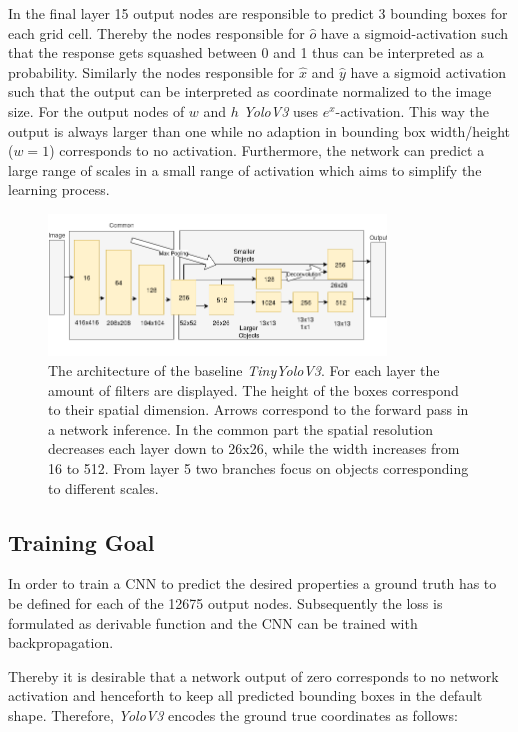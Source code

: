 	In the final layer 15 output nodes are responsible to predict 3 bounding boxes for each grid cell. Thereby the nodes responsible for $\hat o$ have a sigmoid-activation such that the response gets squashed between 0 and 1 thus can be interpreted as a probability. Similarly the nodes responsible for $\hat x$ and $\hat y$ have a sigmoid activation such that the output can be interpreted as coordinate normalized to the image size. For the output nodes of $w$ and $h$ \textit{YoloV3} uses $e^x$-activation. This way the output is always larger than one while no adaption in bounding box width/height ($w=1$) corresponds to no activation. Furthermore, the network can predict a large range of scales in a small range of activation which aims to simplify the learning process.
	
			
	\begin{figure}[hbtp]
		\centering
		\includegraphics[width=0.8\textwidth]{fig/tinyyolov3_arch}
		\caption{The architecture of the baseline \textit{TinyYoloV3}. For each layer the amount of filters are displayed. The height of the boxes correspond to their spatial dimension. Arrows correspond to the forward pass in a network inference. In the common part the spatial resolution decreases each layer down to 26x26, while the width increases from 16 to 512. From layer 5 two branches focus on objects corresponding to different scales. }
		\label{fig:tinyyolov3_arch}
	\end{figure}
	

	\subsection{Training Goal}
	
	In order to train a \ac{CNN} to predict the desired properties a ground truth has to be defined for each of the 12675 output nodes. Subsequently the loss is formulated as derivable function and the \ac{CNN} can be trained with backpropagation.
	
	Thereby it is desirable that a network output of zero corresponds to no network activation and henceforth to keep all predicted bounding boxes in the default shape. Therefore, \textit{YoloV3} encodes the ground true coordinates as follows:
	 
